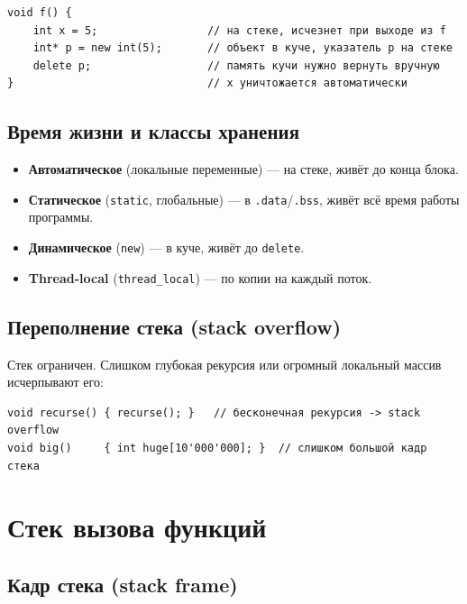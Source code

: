\begin{lstlisting}
void f() {
    int x = 5;                 // на стеке, исчезнет при выходе из f
    int* p = new int(5);       // объект в куче, указатель p на стеке
    delete p;                  // память кучи нужно вернуть вручную
}                              // x уничтожается автоматически
\end{lstlisting}

\subsection{Время жизни и классы хранения}

\begin{itemize}[leftmargin=2em]
    \item \textbf{Автоматическое} (локальные переменные) --- на стеке, живёт до
          конца блока.
    \item \textbf{Статическое} (\texttt{static}, глобальные) --- в \texttt{.data}/\texttt{.bss},
          живёт всё время работы программы.
    \item \textbf{Динамическое} (\texttt{new}) --- в куче, живёт до \texttt{delete}.
    \item \textbf{Thread-local} (\texttt{thread\_local}) --- по копии на каждый поток.
\end{itemize}

\subsection{Переполнение стека (stack overflow)}

Стек ограничен. Слишком глубокая рекурсия или огромный локальный массив
исчерпывают его:

\begin{lstlisting}
void recurse() { recurse(); }   // бесконечная рекурсия -> stack overflow
void big()     { int huge[10'000'000]; }  // слишком большой кадр стека
\end{lstlisting}


\section{Стек вызова функций}

\subsection{Кадр стека (stack frame)}

